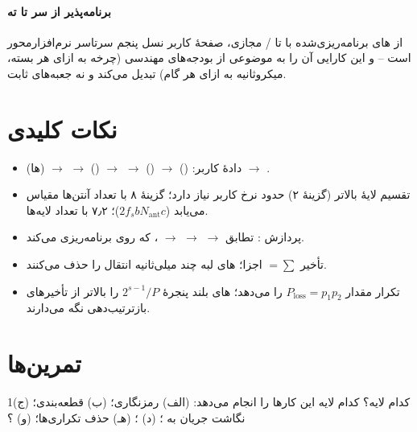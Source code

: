 \documentclass[11pt,a4paper]{article}
\begin{document}
\paragraph{برنامه‌پذیر از سر تا ته} از های برنامه‌ریزی‌شده با  تا / مجازی، صفحهٔ کاربر نسل پنجم سرتاسر نرم‌افزارمحور
است -- و این کارایی آن را به موضوعی از بودجه‌های مهندسی (چرخه به ازای هر بسته، میکروثانیه به ازای هر گام) تبدیل می‌کند و نه جعبه‌های ثابت.

\section{نکات کلیدی}
\begin{takeawaybox}
\begin{itemize}
  \item دادهٔ کاربر:  () $\to$  () $\to$  $\to$  () $\to$ 
        $\to$ (ها) $\to$ .
  \item تقسیم لایهٔ بالاتر (گزینهٔ ۲) حدود نرخ کاربر نیاز دارد؛ گزینهٔ ۸ با تعداد آنتن‌ها مقیاس می‌یابد ($2f_s b N_{\mathrm{ant}} c$)؛ ۷٫۲ با تعداد لایه‌ها.
  \item پردازش : تطابق  $\to$  $\to$  $\to$ ، که  روی  برنامه‌ریزی می‌کند.
  \item تأخیر $= \sum$ اجزا؛ های لبه چند میلی‌ثانیه انتقال را حذف می‌کنند.
  \item تکرار  مقدار $P_{\mathrm{loss}} = p_1p_2$ را می‌دهد؛ های بلند پنجرهٔ $2^{s-1}/P$ را بالاتر از تأخیرهای بازترتیب‌دهی نگه می‌دارند.
\end{itemize}
\end{takeawaybox}

\section{تمرین‌ها}

\begin{exercisebox}{1}{کدام لایه؟}\label{exr:layer}
کدام لایه این کارها را انجام می‌دهد: (الف) رمزنگاری؛ (ب) قطعه‌بندی؛ (ج) نگاشت جریان  به ؛ (د) ؛ (هـ) حذف تکراری‌ها؛
(و) ؟
\end{exercisebox}
\end{document}
